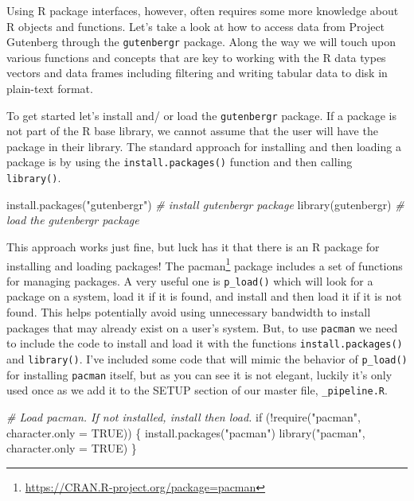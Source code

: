 \documentclass[
  letterpaper,
]{latex/krantz}
\newenvironment{Shaded}{\begin{snugshade}}{\end{snugshade}}
\newcommand{\AttributeTok}[1]{\textcolor[rgb]{0.00,0.00,0.00}{#1}}
\newcommand{\CommentTok}[1]{\textcolor[rgb]{0.00,0.00,0.00}{\textit{#1}}}
\newcommand{\ConstantTok}[1]{\textcolor[rgb]{0.00,0.00,0.00}{#1}}
\newcommand{\ControlFlowTok}[1]{\textcolor[rgb]{0.00,0.00,0.00}{#1}}
\newcommand{\FunctionTok}[1]{\textcolor[rgb]{0.00,0.00,0.00}{#1}}
\newcommand{\NormalTok}[1]{\textcolor[rgb]{0.00,0.00,0.00}{#1}}
\newcommand{\SpecialCharTok}[1]{\textcolor[rgb]{0.00,0.00,0.00}{#1}}
\newcommand{\StringTok}[1]{\textcolor[rgb]{0.00,0.00,0.00}{#1}}
\DeclareRobustCommand{\href}[2]{#2\footnote{\url{#1}}}
\begin{document}
Using R package interfaces, however, often requires some more knowledge
about R objects and functions. Let's take a look at how to access data
from Project Gutenberg through the \texttt{gutenbergr} package. Along
the way we will touch upon various functions and concepts that are key
to working with the R data types vectors and data frames including
filtering and writing tabular data to disk in plain-text format.

To get started let's install and/ or load the \texttt{gutenbergr}
package. If a package is not part of the R base library, we cannot
assume that the user will have the package in their library. The
standard approach for installing and then loading a package is by using
the \texttt{install.packages()} function and then calling
\texttt{library()}.

\begin{Shaded}
\begin{Highlighting}[]
\FunctionTok{install.packages}\NormalTok{(}\StringTok{"gutenbergr"}\NormalTok{) }\CommentTok{\# install \textasciigrave{}gutenbergr\textasciigrave{} package}
\FunctionTok{library}\NormalTok{(gutenbergr) }\CommentTok{\# load the \textasciigrave{}gutenbergr\textasciigrave{} package}
\end{Highlighting}
\end{Shaded}

This approach works just fine, but luck has it that there is an R
package for installing and loading packages! The
\href{https://CRAN.R-project.org/package=pacman}{pacman} package
includes a set of functions for managing packages. A very useful one is
\texttt{p\_load()} which will look for a package on a system, load it if
it is found, and install and then load it if it is not found. This helps
potentially avoid using unnecessary bandwidth to install packages that
may already exist on a user's system. But, to use \texttt{pacman} we
need to include the code to install and load it with the functions
\texttt{install.packages()} and \texttt{library()}. I've included some
code that will mimic the behavior of \texttt{p\_load()} for installing
\texttt{pacman} itself, but as you can see it is not elegant, luckily
it's only used once as we add it to the SETUP section of our master
file, \texttt{\_pipeline.R}.

\begin{Shaded}
\begin{Highlighting}[]
\CommentTok{\# Load \textasciigrave{}pacman\textasciigrave{}. If not installed, install then load.}
\ControlFlowTok{if}\NormalTok{ (}\SpecialCharTok{!}\FunctionTok{require}\NormalTok{(}\StringTok{"pacman"}\NormalTok{, }\AttributeTok{character.only =} \ConstantTok{TRUE}\NormalTok{)) \{}
  \FunctionTok{install.packages}\NormalTok{(}\StringTok{"pacman"}\NormalTok{)}
  \FunctionTok{library}\NormalTok{(}\StringTok{"pacman"}\NormalTok{, }\AttributeTok{character.only =} \ConstantTok{TRUE}\NormalTok{)}
\NormalTok{\}}
\end{Highlighting}
\end{Shaded}
\end{document}
